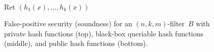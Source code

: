 \begin{figure}
{{\medskip
{}\\
Ret $\left(h_1(x),\ldots,h_k(x)\right)$\\
} } \caption{False-positive security (soundness) for an
$(n,k,m)$-filter~$B$ with private hash functions (top), black-box
queriable hash functions (middle), and public hash functions
(bottom).  } \label{fig:fp-filter}
\end{figure}





